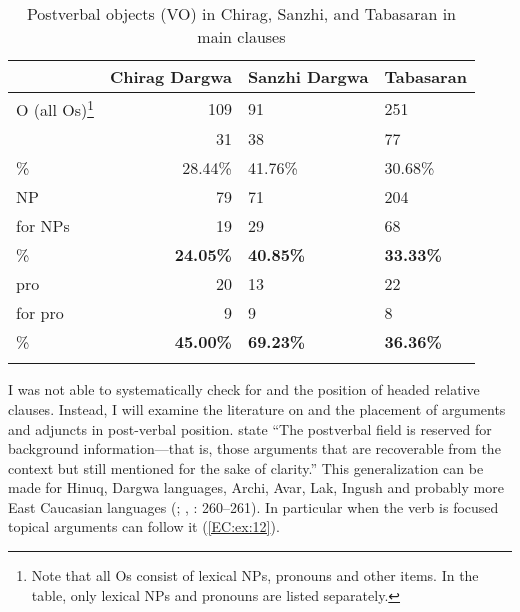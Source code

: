 \documentclass[output=paper,colorlinks,citecolor=brown,draftmode]{langscibook}
\begin{document}
\begin{table}[t]
 \begin{tabularx}{\textwidth}{lrYY}
\lsptoprule
 & Chirag Dargwa & Sanzhi Dargwa & Tabasaran \\
\midrule
O (all Os)\footnote{Note that all Os consist of lexical NPs, pronouns and other items. In the table, only lexical NPs and pronouns are listed separately. } & 109 & 91 & 251 \\
 & 31 & 38 & 77 \\
\% & 28.44\% & 41.76\% & 30.68\% \\
\tablevspace
NP & 79 & 71 & 204 \\
 for NPs & 19 & 29 & 68 \\
\% & \textbf{24.05\%} & \textbf{40.85\%} & \textbf{33.33\%} \\
\tablevspace
pro & 20 & 13 & 22 \\
 for pro & 9 & 9 & 8 \\
\% & \textbf{45.00\%} & \textbf{69.23\%} & \textbf{36.36\%} \\
\lspbottomrule
\end{tabularx}

 \caption{Postverbal objects (VO) in Chirag, Sanzhi, and Tabasaran in main clauses }
 \label{EC:tab:7}
\end{table}

\begin{sloppypar}
I was not able to systematically check for  and the position of headed relative clauses. Instead, I will examine the literature on  and the placement of arguments and adjuncts in post-verbal position. \citet[129]{ganenkov_nakh-dagestanian_2021} state ``The postverbal field is reserved for background information—that is, those arguments that are recoverable from the context but still mentioned for the sake of clarity.'' This generalization can be made for Hinuq, Dargwa languages, Archi, Avar, Lak, Ingush and probably more East Caucasian languages (\citealt{forker_word_2016}; \citealt{komen_post-verbal_2017}, \citealt{testelets_wordDaghestanian_1998}: 260--261). In particular when the verb is focused topical arguments can follow it (\ref{EC:ex:12}). 
\end{sloppypar}
\end{document}
